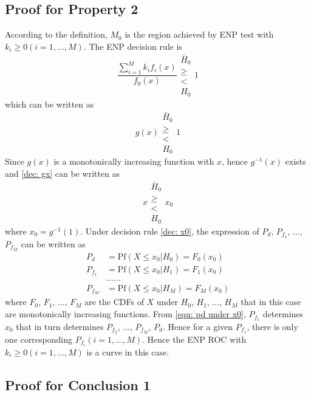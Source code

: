\documentclass[12pt,journal,a4paper,twoside,doublecolumn]{IEEEtran}
\begin{document}
\begin{spacing}{1.0}
\subsection{Proof for Property 2}
According to the definition, $M_0$ is the region achieved by ENP test with $k_i \geq 0 (i=1, ..., M)$. The ENP decision rule is
\begin{equation}
\frac{\sum_{i=1}^{M}k_if_i(x)}{f_0(x)} \substack{\bar{H}_0 \\\geq\\< \\H_0}1
\end{equation}
which can be written as
\begin{equation}
\label{dec: gx}
g(x)\substack{\bar{H}_0 \\\geq\\< \\H_0}1
\end{equation}
Since $g(x)$ is a monotonically increasing function with $x$, hence $g^{-1}(x)$ exists and \eqref{dec: gx} can be written as 
\begin{equation}
\label{dec: x0}
x\substack{\bar{H}_0 \\\geq\\< \\H_0}x_0
\end{equation}
where $x_0 = g^{-1}(1)$.
Under decision rule \eqref{dec: x0}, the expression of $P_d$, $P_{f_1}$, ..., $P_{f_M}$ can be written as 
\begin{equation}
\begin{split}
\label{equ: pd under x0}
P_d &= \text{Pf}(X \leq x_0 | H_0) = F_0(x_0)\\
P_{f_1} &= \text{Pf}(X \leq x_0 | H_1) = F_1(x_0)\\
  &......\\
P_{f_M} &= \text{Pf}(X \leq x_0 | H_M) = F_M(x_0)
\end{split}
\end{equation}
where $F_0$, $F_1$, ..., $F_M$ are the CDFs of $X$ under $H_0$, $H_1$, ..., $H_M$ that in this case are monotonically increasing functions. From \eqref{equ: pd under x0}, $P_{f_1}$ determines $x_0$ that in turn determines $P_{f_2}$, ..., $P_{f_M}$, $P_d$. Hence for a given $P_{f_1}$, there is only one corresponding $P_{f_i} (i= 1, ..., M)$. Hence the ENP ROC with $k_i \geq 0 (i = 1, ..., M)$ is a curve in this case. 
\subsection{Proof for Conclusion 1}


\end{spacing}
\end{document}
